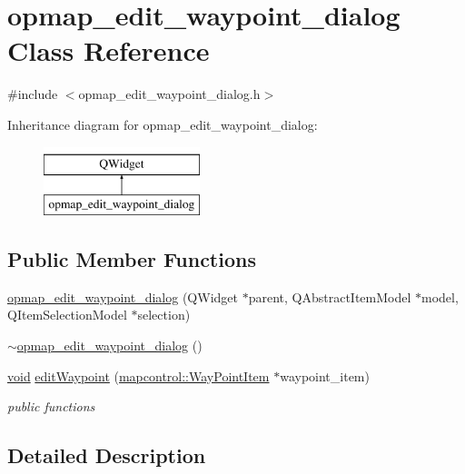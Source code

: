 \hypertarget{classopmap__edit__waypoint__dialog}{\section{opmap\-\_\-edit\-\_\-waypoint\-\_\-dialog Class Reference}
\label{classopmap__edit__waypoint__dialog}
}


{\ttfamily \#include $<$opmap\-\_\-edit\-\_\-waypoint\-\_\-dialog.\-h$>$}

Inheritance diagram for opmap\-\_\-edit\-\_\-waypoint\-\_\-dialog\-:\begin{figure}[H]
\begin{center}
\leavevmode
\includegraphics[height=2.000000cm]{classopmap__edit__waypoint__dialog}
\end{center}
\end{figure}
\subsection*{Public Member Functions}
\begin{DoxyCompactItemize}
\item 
\hyperlink{group___o_p_map_plugin_ga0681c04758995d1dca076a79d6c7ebb8}{opmap\-\_\-edit\-\_\-waypoint\-\_\-dialog} (Q\-Widget $\ast$parent, Q\-Abstract\-Item\-Model $\ast$model, Q\-Item\-Selection\-Model $\ast$selection)
\item 
\hyperlink{group___o_p_map_plugin_ga7d3684f9a7139a132614c5f4d9d91910}{$\sim$opmap\-\_\-edit\-\_\-waypoint\-\_\-dialog} ()
\item 
\hyperlink{group___u_a_v_objects_plugin_ga444cf2ff3f0ecbe028adce838d373f5c}{void} \hyperlink{group___o_p_map_plugin_gaf5d4c9a4e4bc3c4b358df3168b2e6b03}{edit\-Waypoint} (\hyperlink{classmapcontrol_1_1_way_point_item}{mapcontrol\-::\-Way\-Point\-Item} $\ast$waypoint\-\_\-item)
\begin{DoxyCompactList}\small\item\em public functions \end{DoxyCompactList}\end{DoxyCompactItemize}


\subsection{Detailed Description}


